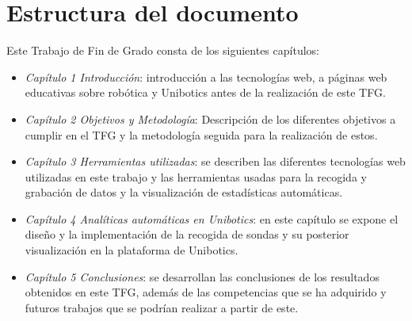 \section{Estructura del documento}

Este Trabajo de Fin de Grado consta de los siguientes capítulos:

\begin{itemize}
    \item \textit{Capítulo 1 Introducción}: introducción a las tecnologías web, a páginas web educativas sobre robótica y Unibotics antes de la realización de este TFG.
    \item \textit{Capítulo 2 Objetivos y Metodología}: Descripción de los diferentes objetivos a cumplir en el TFG y la metodología seguida para la realización de estos.
    \item \textit{Capítulo 3 Herramientas utilizadas}: se describen las diferentes tecnologías web utilizadas en este trabajo y las herramientas usadas para la recogida y grabación de datos y la visualización de estadísticas automáticas.
   \item \textit{Capítulo 4 Analíticas automáticas en Unibotics}: en este capítulo se expone el diseño y la implementación de la recogida de sondas y su posterior visualización en la plataforma de Unibotics.
  \item \textit{Capítulo 5 Conclusiones}: se desarrollan las conclusiones de los resultados obtenidos en este TFG, además de las competencias que se ha adquirido y futuros trabajos que se podrían realizar a partir de este.
   \end{itemize}